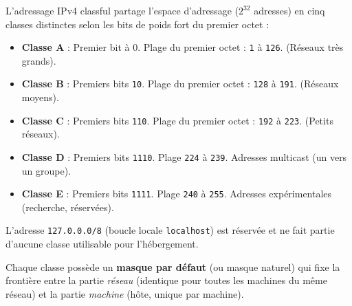 \documentclass[11pt]{article}
\newcommand{\cle}[1]{{\popxbold\color{popdark}#1}}
\begin{document}
\begin{definition}
L'adressage IPv4 classful partage l'espace d'adressage ($2^{32}$ adresses) en cinq classes distinctes selon les bits de poids fort du premier octet :
\begin{itemize}
    \item \textbf{Classe A} : Premier bit à 0. Plage du premier octet : \texttt{1} à \texttt{126}. (Réseaux très grands).
    \item \textbf{Classe B} : Premiers bits \texttt{10}. Plage du premier octet : \texttt{128} à \texttt{191}. (Réseaux moyens).
    \item \textbf{Classe C} : Premiers bits \texttt{110}. Plage du premier octet : \texttt{192} à \texttt{223}. (Petits réseaux).
    \item \textbf{Classe D} : Premiers bits \texttt{1110}. Plage \texttt{224} à \texttt{239}. Adresses \cle{multicast} (un vers un groupe).
    \item \textbf{Classe E} : Premiers bits \texttt{1111}. Plage \texttt{240} à \texttt{255}. Adresses \cle{expérimentales} (recherche, réservées).
\end{itemize}
L'adresse \texttt{127.0.0.0/8} (boucle locale \texttt{localhost}) est réservée et ne fait partie d'aucune classe utilisable pour l'hébergement.
\end{definition}

Chaque classe possède un \textbf{masque par défaut} (ou masque naturel) qui fixe la frontière entre la partie \emph{réseau} (identique pour toutes les machines du même réseau) et la partie \emph{machine} (hôte, unique par machine).
\end{document}
